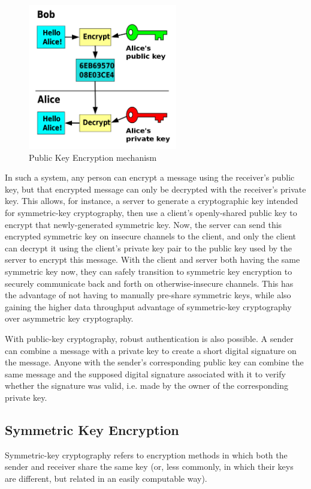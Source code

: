 \documentclass[a4paper]{article}
\begin{document}
    \begin{figure}[H]
      \centering
      \includegraphics[height=2.5in]{../ref/publickey.png}
      \caption{Public Key Encryption mechanism}
      \label{fig:publickey}
    \end{figure}

    In such a system, any person can encrypt a message using the receiver's public key, 
    but that encrypted message can only be decrypted with the receiver's private key. 
    This allows, for instance, a server to generate a cryptographic key intended for 
    symmetric-key cryptography, then use a client's openly-shared public key to encrypt 
    that newly-generated symmetric key. Now, the server can send this encrypted symmetric 
    key on insecure channels to the client, and only the client can decrypt it using 
    the client's private key pair to the public key used by the server to encrypt this 
    message. With the client and server both having the same symmetric key now, they 
    can safely transition to symmetric key encryption to securely communicate back and 
    forth on otherwise-insecure channels. This has the advantage of not having to manually 
    pre-share symmetric keys, while also gaining the higher data throughput advantage of 
    symmetric-key cryptography over asymmetric key cryptography.

    With public-key cryptography, robust authentication is also possible. 
    A sender can combine a message with a private key to create a short digital signature 
    on the message. Anyone with the sender's corresponding public key can combine the same 
    message and the supposed digital signature associated with it to verify whether the 
    signature was valid, i.e. made by the owner of the corresponding private key.

    \subsection{Symmetric Key Encryption}
    Symmetric-key cryptography refers to encryption methods in which both the sender and 
    receiver share the same key (or, less commonly, in which their keys are different, but 
    related in an easily computable way).
\end{document}
